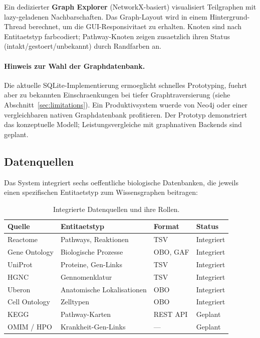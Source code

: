 \documentclass[12pt,a4paper]{article}
\begin{document}
Ein dedizierter \textbf{Graph Explorer} (NetworkX-basiert) visualisiert Teilgraphen mit lazy-geladenen Nachbarschaften. Das Graph-Layout wird in einem Hintergrund-Thread berechnet, um die GUI-Responsivitaet zu erhalten. Knoten sind nach Entitaetstyp farbcodiert; Pathway-Knoten zeigen zusaetzlich ihren Status (intakt/gestoert/unbekannt) durch Randfarben an.

\paragraph{Hinweis zur Wahl der Graphdatenbank.} Die aktuelle SQLite-Implementierung ermoeglicht schnelles Prototyping, fuehrt aber zu bekannten Einschraenkungen bei tiefer Graphtraversierung (siehe Abschnitt~\ref{sec:limitations}). Ein Produktivsystem wuerde von Neo4j oder einer vergleichbaren nativen Graphdatenbank profitieren. Der Prototyp demonstriert das konzeptuelle Modell; Leistungsvergleiche mit graphnativen Backends sind geplant.

\subsection{Datenquellen}
\label{sec:datasources}

Das System integriert sechs oeffentliche biologische Datenbanken, die jeweils einen spezifischen Entitaetstyp zum Wissensgraphen beitragen:

\begin{table}[H]
\centering
\caption{Integrierte Datenquellen und ihre Rollen.}
\label{tab:datasources}
\begin{tabular}{llll}
\toprule
\textbf{Quelle} & \textbf{Entitaetstyp} & \textbf{Format} & \textbf{Status} \\
\midrule
Reactome \citep{Fabregat2018} & Pathways, Reaktionen & TSV & Integriert \\
Gene Ontology \citep{Ashburner2000} & Biologische Prozesse & OBO, GAF & Integriert \\
UniProt \citep{UniProt2023} & Proteine, Gen-Links & TSV & Integriert \\
HGNC \citep{Braschi2019} & Gennomenklatur & TSV & Integriert \\
Uberon \citep{Mungall2012} & Anatomische Lokalisationen & OBO & Integriert \\
Cell Ontology \citep{Diehl2016} & Zelltypen & OBO & Integriert \\
KEGG \citep{Kanehisa2023} & Pathway-Karten & REST API & Geplant \\
OMIM \citep{Amberger2019} / HPO \citep{Robinson2008} & Krankheit-Gen-Links & --- & Geplant \\
\bottomrule
\end{tabular}
\end{table}
\end{document}
